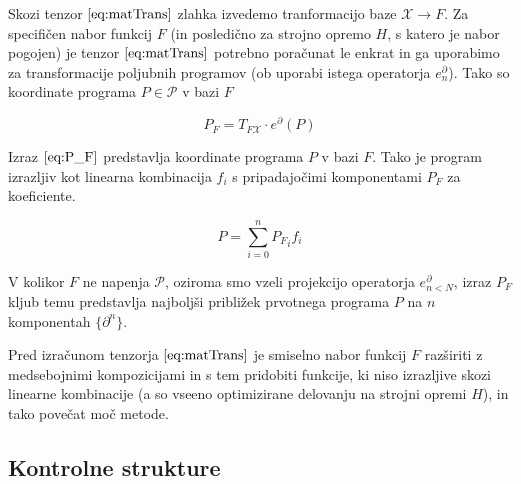 \documentclass{article}
\newcommand{\X}{\mathcal{X}}
\newcommand{\dP}{\mathcal{P}}
\newcommand{\D}{\partial}
\begin{document}
  Skozi tenzor $\eqref{eq:matTrans}$ zlahka izvedemo tranformacijo baze $\X\to F$. Za specifičen nabor funkcij $F$ (in posledično za strojno opremo $H$, s katero je nabor pogojen) je tenzor $\eqref{eq:matTrans}$ potrebno poračunat le enkrat in ga uporabimo za transformacije poljubnih programov (ob uporabi istega operatorja $e^\D_n$).
  Tako so koordinate programa $P\in\dP$ v bazi $F$
  
  \begin{equation}\label{eq:P_F}
  	P_F=T_{F\X}\cdot e^\D(P)
  \end{equation}
  
  Izraz $\eqref{eq:P_F}$ predstavlja koordinate programa $P$ v bazi $F$. Tako je program izrazljiv kot linearna kombinacija $f_i$ s pripadajočimi komponentami $P_F$ za koeficiente.
  
  \begin{equation}
  P=\sum\limits_{i=0}^{n}{P_F}_if_i
  \end{equation}
  
  V kolikor $F$ ne napenja $\dP$, oziroma smo vzeli projekcijo operatorja $e^\D_{n<N}$, izraz $P_F$ kljub temu predstavlja najboljši približek prvotnega programa $P$ na $n$ komponentah $\{\D^n\}$.
  
  Pred izračunom tenzorja $\eqref{eq:matTrans}$ je smiselno nabor funkcij $F$ razširiti z medsebojnimi kompozicijami in s tem pridobiti funkcije, ki niso izrazljive skozi linearne kombinacije (a so vseeno optimizirane delovanju na strojni opremi $H$), in tako povečat moč metode.
  
 \subsection{Kontrolne strukture}
 
\end{document}
